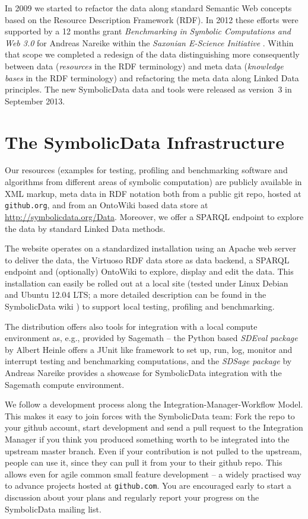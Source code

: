 \documentclass{llncs}
\newcommand{\SD}{{\sc SymbolicData}}
\begin{document}
In 2009 we started to refactor the data along standard Semantic Web concepts
based on the Resource Description Framework (RDF).  In 2012 these efforts were
supported by a 12 months grant \emph{Benchmarking in Symbolic Computations and
  Web 3.0} for Andreas Nareike within the \emph{Saxonian E-Science Initiative}
\cite{E-Science-Sachsen}.  Within that scope we completed a redesign of the
data distinguishing more consequently between data (\emph{resources} in the
RDF terminology) and meta data (\emph{knowledge bases} in the RDF terminology)
and refactoring the meta data along Linked Data principles.  The new {\SD}
data and tools were released as version~3 in September 2013.

\section{The {\SD} Infrastructure}

Our resources (examples for testing, profiling and benchmarking software and
algorithms from different areas of symbolic computation) are publicly
available in XML markup, meta data in RDF notation both from a public git
repo, hosted at \texttt{github.org}, and from an OntoWiki \cite{OntoWiki}
based data store at \url{http://symbolicdata.org/Data}.  Moreover, we offer a
SPARQL endpoint \cite{sdsparql} to explore the data by standard Linked Data
methods.

The website operates on a standardized installation using an Apache web server
to deliver the data, the Virtuoso RDF data store \cite{Virtuoso} as data
backend, a SPARQL endpoint and (optionally) OntoWiki to explore, display and
edit the data.  This installation can easily be rolled out at a local site
(tested under Linux Debian and Ubuntu 12.04 LTS; a more detailed description
can be found in the {\SD} wiki \cite{sdwiki}) to support local testing,
profiling and benchmarking.

The distribution offers also tools for integration with a local compute
environment as, e.g., provided by Sagemath \cite{Sagemath} -- the Python based
\emph{SDEval package} \cite{sdeval} by Albert Heinle offers a JUnit like
framework to set up, run, log, monitor and interrupt testing and benchmarking
computations, and the \emph{SDSage package} \cite{sdsage} by Andreas Nareike
provides a showcase for {\SD} integration with the Sagemath compute
environment.

We follow a development process along the Integration-Manager-Workflow Model.
This makes it easy to join forces with the {\SD} team: Fork the repo to your
github account, start development and send a pull request to the Integration
Manager if you think you produced something worth to be integrated into the
upstream master branch.  Even if your contribution is not pulled to the
upstream, people can use it, since they can pull it from your to their github
repo. This allows even for agile common small feature development -- a widely
practised way to advance projects hosted at \texttt{github.com}. You are
encouraged early to start a discussion about your plans and regularly report
your progress on the {\SD} mailing list.
\end{document}
